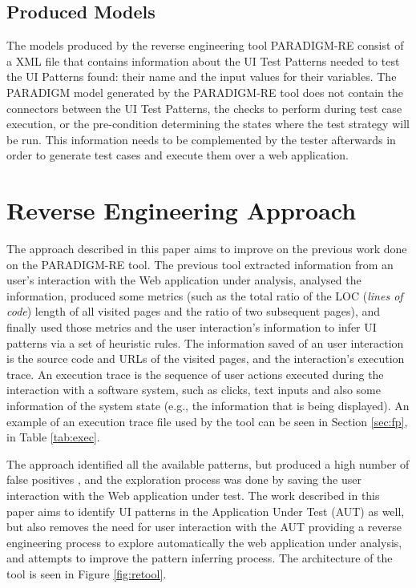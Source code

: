 \documentclass[conference]{IEEEtran}
\begin{document}
\subsection{Produced Models}

The models produced by the reverse engineering tool PARADIGM-RE consist of a XML file that contains information about the UI Test Patterns needed to test the UI Patterns found: their name and the input values for their variables. The PARADIGM model generated by the PARADIGM-RE tool does not contain the connectors between the UI Test Patterns, the checks to perform during test case execution, or the pre-condition determining the states where the test strategy will be run. This information needs to be complemented by the tester afterwards in order to generate test cases and execute them over a web application.

\section{Reverse Engineering Approach}\label{sec:re}

The  approach described in this paper aims to improve on the previous work \cite{nabuco2013inferring} done on the PARADIGM-RE tool. The previous tool extracted information from an user's interaction with the Web application under analysis, analysed the information, produced some metrics (such as the total ratio of the LOC (\textit{lines of code}) length of all visited pages and the ratio of two subsequent pages), and finally used those metrics and the user interaction's information to infer UI patterns via a set of heuristic rules. The information saved of an user interaction is the source code and URLs of the visited pages, and the interaction's execution trace. An execution trace is the sequence of user actions executed during the interaction with a software system, such as clicks, text inputs and also some information of the system state (e.g., the information that is being displayed). An example of an execution trace file used by the tool can be seen in Section \ref{sec:fp}, in Table \ref{tab:exec}.

The approach identified all the available patterns, but produced a high number of false positives \cite{nabuco2013inferring}, and the exploration process was done by saving the user interaction with the Web application under test. The work described in this paper aims to identify UI patterns in the Application Under Test (AUT) as well, but also removes the need for user interaction with the AUT providing a reverse engineering process to explore automatically the web application under analysis, and attempts to improve the pattern inferring process. The architecture of the tool is seen in Figure \ref{fig:retool}.
\end{document}
